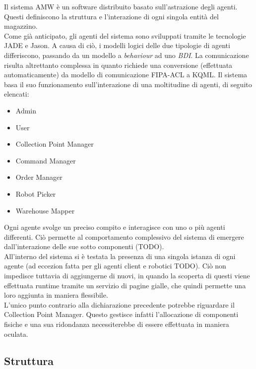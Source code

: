 Il sistema AMW è un software distribuito basato sull'astrazione degli agenti. Questi definiscono la struttura e l'interazione di ogni singola entità del magazzino.\\
Come già anticipato, gli agenti del sistema sono sviluppati tramite le tecnologie JADE e Jason. A causa di ciò, i modelli logici delle due tipologie di agenti differiscono, passando da un modello a \textit{behaviour} ad uno \textit{BDI}. La comunicazione risulta altrettanto complessa in quanto richiede una conversione (effettuata automaticamente) da modello di comunicazione FIPA-ACL a KQML.
\parag
Il sistema basa il suo funzionamento sull’interazione di una moltitudine di agenti, di seguito elencati:
\begin{itemize}
    \item Admin
    \item User
    \item Collection Point Manager
    \item Command Manager
    \item Order Manager
    \item Robot Picker
    \item Warehouse Mapper
\end{itemize}
Ogni agente svolge un preciso compito e interagisce con uno o più agenti differenti. Ciò permette al comportamento complessivo del sistema di emergere dall'interazione delle sue sotto componenti (TODO).\\
All'interno del sistema si è testata la presenza di una singola istanza di ogni agente (ad eccezion fatta per gli agenti client e robotici TODO). Ciò non impedisce tuttavia di aggiungerne di nuovi, in quando la scoperta di questi viene effettuata runtime tramite un servizio di pagine gialle, che quindi permette una loro aggiunta in maniera flessibile.\\
L'unico punto contrario alla dichiarazione precedente potrebbe riguardare il Collection Point Manager. Questo gestisce infatti l'allocazione di componenti fisiche e una sua ridondanza necessiterebbe di essere effettuata in maniera oculata.

\subsection{Struttura}

